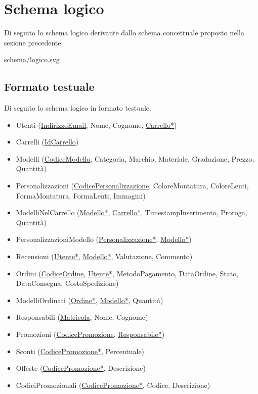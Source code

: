 \section{Schema logico}
Di seguito lo schema logico derivante dallo schema concettuale proposto nella sezione precedente.

\begin{center}
	 {schema/logico.svg}
\end{center}

\subsection{Formato testuale}
Di seguito lo schema logico in formato testuale.
\begin{itemize}
	\item Utenti (\underline{IndirizzoEmail}, Nome, Cognome, \underline{Carrello*})
	\item Carrelli (\underline{IdCarrello})
	\item Modelli (\underline{CodiceModello}, Categoria, Marchio, Materiale, Gradazione, Prezzo,
	      Quantità)
	\item Personalizzazioni (\underline{CodicePersonalizzazione}, ColoreMontatura, ColoreLenti,
	      FormaMontatura, FormaLenti, Immagini)
	\item ModelliNelCarrello (\underline{Modello*}, \underline{Carrello*}, TimestampInserimento,
	      Proroga, Quantità)
	\item PersonalizzazioniModello (\underline{Personalizzazione*}, \underline{Modello*})
	\item Recensioni (\underline{Utente*}, \underline{Modello*}, Valutazione, Commento)
	\item Ordini (\underline{CodiceOrdine}, \underline{Utente*}, MetodoPagamento, DataOrdine,
	      Stato, DataConsegna, CostoSpedizione)
	\item ModelliOrdinati (\underline{Ordine*}, \underline{Modello*}, Quantità)
	\item Responsabili (\underline{Matricola}, Nome, Cognome)
	\item Promozioni (\underline{CodicePromozione}, \underline{Responsabile*})
	\item Sconti (\underline{CodicePromozione*}, Percentuale)
	\item Offerte (\underline{CodicePromozione*}, Descrizione)
	\item CodiciPromozionali (\underline{CodicePromozione*}, Codice, Descrizione)
\end{itemize}


